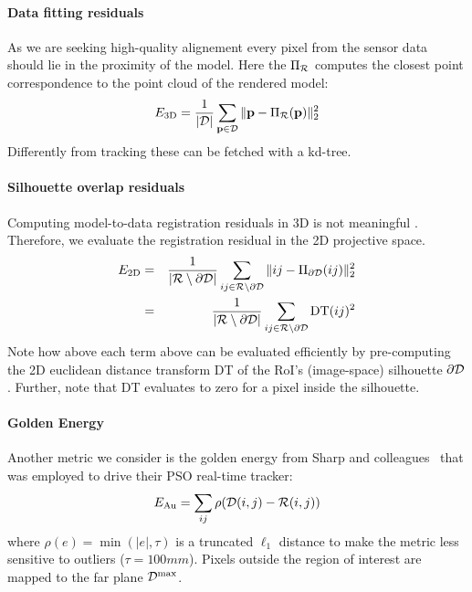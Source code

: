 \paragraph{Data fitting residuals }
As we are seeking high-quality alignement every pixel from the sensor data should lie in the proximity of the model. Here the $\Pi_{\mathcal{R}}$ computes the closest point correspondence to the point cloud of the rendered model:
\begin{equation}
E_\text{3D} = \frac{1}{|\mathcal{D}|}\sum_{\mathbf{p} \in \mathcal{D}} \| \mathbf{p} - \Pi_{\mathcal{R}}(\mathbf{p}) \|_2^2
\label{eq:metric1}
\end{equation}
Differently from tracking these can be fetched with a kd-tree.

\paragraph{Silhouette overlap residuals }
Computing model-to-data registration residuals in 3D is not meaningful . Therefore, we evaluate the registration residual in the 2D projective space. 
\begin{eqnarray}
E_\text{2D} 
&=& \frac{1}{|\mathcal{R} \setminus \partial\mathcal{D}|} 
\sum_{ij \in \mathcal{R} \setminus \partial\mathcal{D}} \| ij - \Pi_{\partial\mathcal{D}}(ij) \|_2^2 \\ 
&=& \frac{1}{|\mathcal{R} \setminus \partial\mathcal{D}|} 
\sum_{ij \in \mathcal{R} \setminus \partial\mathcal{D}} \text{DT}(ij)^2
\label{eq:metric2}
\end{eqnarray}
Note how above each term above can be evaluated efficiently by pre-computing the 2D euclidean distance transform DT of the RoI's (image-space) silhouette $\partial \mathcal{D}$. Further, note that DT evaluates to zero for a pixel inside the silhouette.


\paragraph{Golden Energy}
Another metric we consider is the golden energy from Sharp and colleagues~ that was employed to drive their PSO real-time tracker:
\begin{equation}
E_{\text{Au}} = \sum_{ij} \rho(\mathcal{D}(i,j) - \mathcal{R}(i,j))
\label{eq:golden}
\end{equation}
where $\rho(e)=\min(|e|,\tau)$ is a truncated $\ell_1$ distance to make the metric less sensitive to outliers ($\tau=100mm$). Pixels outside the region of interest are mapped to the far plane $\mathcal{D}^\text{max}$.